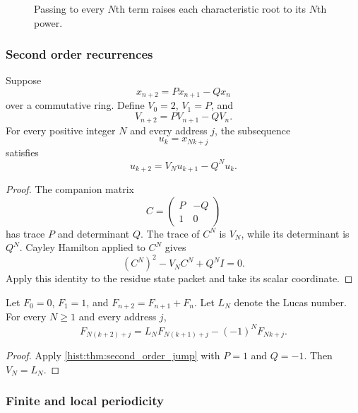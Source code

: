 \begin{figure}[t]
\centering
{}
\caption{Passing to every \(N\)th term raises each characteristic root to its \(N\)th power.}
\label{hist:fig:recurrence_root_power}
\end{figure}

\subsubsection{Second order recurrences}

\begin{histtheorem}\label{hist:thm:second_order_jump}
Suppose
\[
x_{n+2}=Px_{n+1}-Qx_n
\]
over a commutative ring. Define \(V_0=2\), \(V_1=P\), and
\[
V_{n+2}=PV_{n+1}-QV_n.
\]
For every positive integer \(N\) and every address \(j\), the subsequence
\[
u_k=x_{Nk+j}
\]
satisfies
\[
\boxed{
u_{k+2}=V_Nu_{k+1}-Q^Nu_k.}
\]
\end{histtheorem}

\begin{proof}
The companion matrix
\[
C=
\begin{pmatrix}
P&-Q\\
1&0
\end{pmatrix}
\]
has trace \(P\) and determinant \(Q\). The trace of \(C^N\) is \(V_N\), while its determinant is \(Q^N\). Cayley Hamilton applied to \(C^N\) gives
\[
(C^N)^2-V_NC^N+Q^NI=0.
\]
Apply this identity to the residue state packet and take its scalar coordinate.
\end{proof}

\begin{histcorollary}\label{hist:cor:fibonacci_packets}
Let \(F_0=0\), \(F_1=1\), and \(F_{n+2}=F_{n+1}+F_n\). Let \(L_N\) denote the Lucas number. For every \(N\geq1\) and every address \(j\),
\[
\boxed{
F_{N(k+2)+j}
=
L_NF_{N(k+1)+j}
-(-1)^NF_{Nk+j}.
}
\]
\end{histcorollary}

\begin{proof}
Apply \cref{hist:thm:second_order_jump} with \(P=1\) and \(Q=-1\). Then \(V_N=L_N\).
\end{proof}

\subsubsection{Finite and local periodicity}

